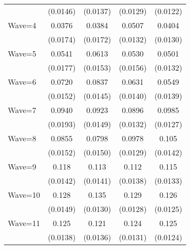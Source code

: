 {\begin{tabular}{l*{4}{c}}
                    &    (0.0146)         &    (0.0137)         &    (0.0129)         &    (0.0122)         \\
[1em]
Wave=4              &      0.0376\sym{*}  &      0.0384\sym{*}  &      0.0507\sym{***}&      0.0404\sym{**} \\
                    &    (0.0174)         &    (0.0172)         &    (0.0132)         &    (0.0130)         \\
[1em]
Wave=5              &      0.0541\sym{**} &      0.0613\sym{***}&      0.0530\sym{***}&      0.0501\sym{***}\\
                    &    (0.0177)         &    (0.0153)         &    (0.0156)         &    (0.0132)         \\
[1em]
Wave=6              &      0.0720\sym{***}&      0.0837\sym{***}&      0.0631\sym{***}&      0.0549\sym{***}\\
                    &    (0.0152)         &    (0.0145)         &    (0.0140)         &    (0.0139)         \\
[1em]
Wave=7              &      0.0940\sym{***}&      0.0923\sym{***}&      0.0896\sym{***}&      0.0985\sym{***}\\
                    &    (0.0193)         &    (0.0149)         &    (0.0132)         &    (0.0127)         \\
[1em]
Wave=8              &      0.0855\sym{***}&      0.0798\sym{***}&      0.0978\sym{***}&       0.105\sym{***}\\
                    &    (0.0152)         &    (0.0150)         &    (0.0129)         &    (0.0142)         \\
[1em]
Wave=9              &       0.118\sym{***}&       0.113\sym{***}&       0.112\sym{***}&       0.115\sym{***}\\
                    &    (0.0142)         &    (0.0141)         &    (0.0138)         &    (0.0133)         \\
[1em]
Wave=10             &       0.128\sym{***}&       0.135\sym{***}&       0.129\sym{***}&       0.126\sym{***}\\
                    &    (0.0149)         &    (0.0130)         &    (0.0128)         &    (0.0125)         \\
[1em]
Wave=11             &       0.125\sym{***}&       0.121\sym{***}&       0.124\sym{***}&       0.125\sym{***}\\
                    &    (0.0138)         &    (0.0136)         &    (0.0131)         &    (0.0124)         \\

\end{tabular}}
